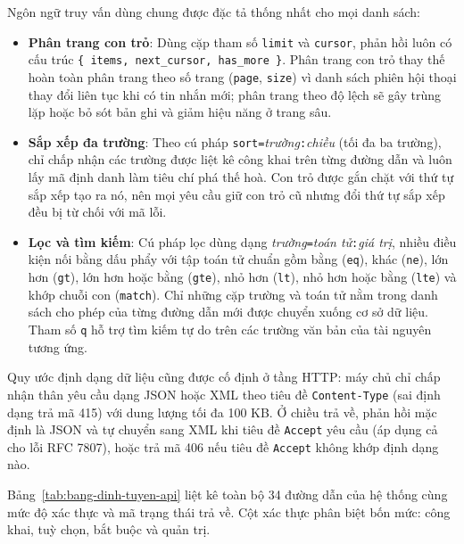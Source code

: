 Ngôn ngữ truy vấn dùng chung được đặc tả thống nhất cho mọi danh sách:

\begin{itemize}
    \item[--] \textbf{Phân trang con trỏ}: Dùng cặp tham số \texttt{limit} và \texttt{cursor}, phản hồi luôn có cấu trúc \texttt{\{ items, next\_cursor, has\_more \}}. Phân trang con trỏ thay thế hoàn toàn phân trang theo số trang (\texttt{page}, \texttt{size}) vì danh sách phiên hội thoại thay đổi liên tục khi có tin nhắn mới; phân trang theo độ lệch sẽ gây trùng lặp hoặc bỏ sót bản ghi và giảm hiệu năng ở trang sâu.
    \item[--] \textbf{Sắp xếp đa trường}: Theo cú pháp \texttt{sort=}\textit{trường}\texttt{:}\textit{chiều} (tối đa ba trường), chỉ chấp nhận các trường được liệt kê công khai trên từng đường dẫn và luôn lấy mã định danh làm tiêu chí phá thế hoà. Con trỏ được gắn chặt với thứ tự sắp xếp tạo ra nó, nên mọi yêu cầu giữ con trỏ cũ nhưng đổi thứ tự sắp xếp đều bị từ chối với mã lỗi.
    \item[--] \textbf{Lọc và tìm kiếm}: Cú pháp lọc dùng dạng \textit{trường}\texttt{=}\textit{toán tử}\texttt{:}\textit{giá trị}, nhiều điều kiện nối bằng dấu phẩy với tập toán tử chuẩn gồm bằng (\texttt{eq}), khác (\texttt{ne}), lớn hơn (\texttt{gt}), lớn hơn hoặc bằng (\texttt{gte}), nhỏ hơn (\texttt{lt}), nhỏ hơn hoặc bằng (\texttt{lte}) và khớp chuỗi con (\texttt{match}). Chỉ những cặp trường và toán tử nằm trong danh sách cho phép của từng đường dẫn mới được chuyển xuống cơ sở dữ liệu. Tham số \texttt{q} hỗ trợ tìm kiếm tự do trên các trường văn bản của tài nguyên tương ứng.
\end{itemize}

Quy ước định dạng dữ liệu cũng được cố định ở tầng HTTP: máy chủ chỉ chấp nhận thân yêu cầu dạng JSON hoặc XML theo tiêu đề \texttt{Content-Type} (sai định dạng trả mã 415) với dung lượng tối đa 100 KB. Ở chiều trả về, phản hồi mặc định là JSON và tự chuyển sang XML khi tiêu đề \texttt{Accept} yêu cầu (áp dụng cả cho lỗi RFC 7807), hoặc trả mã 406 nếu tiêu đề \texttt{Accept} không khớp định dạng nào.

Bảng~\ref{tab:bang-dinh-tuyen-api} liệt kê toàn bộ 34 đường dẫn của hệ thống cùng mức độ xác thực và mã trạng thái trả về. Cột xác thực phân biệt bốn mức: công khai, tuỳ chọn, bắt buộc và quản trị.

